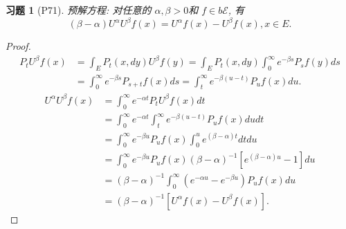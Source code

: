 \documentclass[UTF8,ondside]{ctexart}
\newtheorem{exercise}{习题}[section]
\newcommand{\h}{\mathscr}
\numberwithin{equation}{section}
\begin{document}
	\begin{exercise}[P71]
		预解方程: 对任意的 $\alpha,\beta > 0$和 $f\in b\h E$, 有
		\[
			(\beta-\alpha)U^\alpha U^\beta f(x)=U^\alpha f(x) - U^\beta f(x),x\in E.
		\]
	\end{exercise}
	\begin{proof}
		\[
			\begin{aligned}
				P_t U^\beta f(x)&=\int_E P_t(x,dy)U^\beta f(y)
				=\int_E P_t(x,dy)\int_0^\infty e^{-\beta s}P_s f(y)ds\\
				&=\int_0^\infty e^{-\beta s}P_{s+t} f(x)ds
				=\int_t^\infty e^{-\beta (u-t)}P_u f(x)du.
			\end{aligned}
		\]
		\[
			\begin{aligned}
				U^\alpha U^\beta f(x)&=\int_0^\infty e^{-\alpha t}P_t U^\beta f(x)dt\\
				&=\int_0^\infty e^{-\alpha t}\int_t^\infty e^{-\beta (u-t)}P_u f(x)du dt\\
				&=\int_0^\infty e^{-\beta u}P_u f(x)\int_0^u e^{(\beta - \alpha)t}dtdu\\
				&=\int_0^\infty e^{-\beta u}P_u f(x)(\beta-\alpha)^{-1}[e^{(\beta-\alpha)u}-1]du\\
				&=(\beta-\alpha)^{-1}\int_0^\infty (e^{-\alpha u}-e^{-\beta u})P_u f(x)du\\
				&=(\beta-\alpha)^{-1}[U^\alpha f(x)-U^\beta f(x)].
			\end{aligned}
		\]
	\end{proof}
	\newpage
\end{document}
